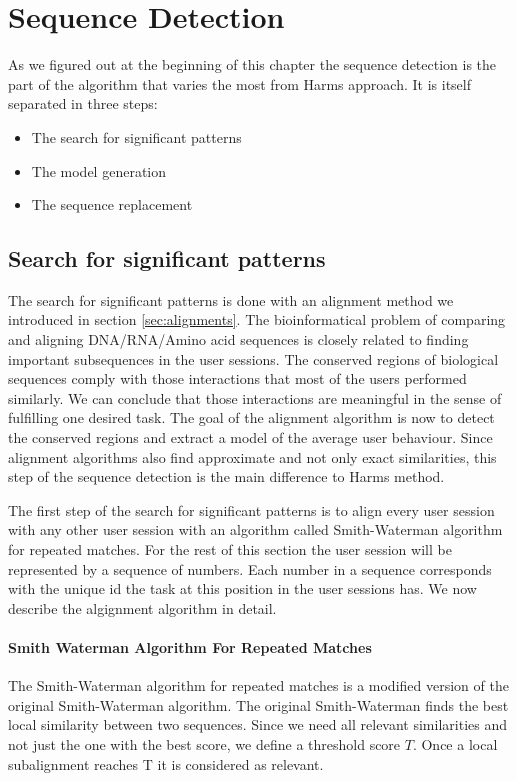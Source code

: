 \section{Sequence Detection}
As we figured out at the beginning of this chapter the sequence detection is the part of the algorithm that varies the most from Harms approach.
It is itself separated in three steps:
\begin{itemize}
	\item The search for significant patterns
	\item The model generation
	\item The sequence replacement
\end{itemize}

\subsection{Search for significant patterns}		
The search for significant patterns is done with an alignment method we introduced in section \ref{sec:alignments}. 
The bioinformatical problem of comparing and aligning DNA/RNA/Amino acid sequences is closely related to finding important subsequences in the user sessions. 
The conserved regions of biological sequences comply with those interactions that most of the users performed similarly. 
We can conclude that those interactions are meaningful in the sense of fulfilling one desired task.
The goal of the alignment algorithm is now to detect the conserved regions and extract a model of the average user behaviour. 
Since alignment algorithms also find approximate and not only exact similarities, this step of the sequence detection is the main difference to Harms method.

The first step of the search for significant patterns is to align every user session with any other user session with an algorithm called Smith-Waterman algorithm for repeated matches.
For the rest of this section the user session will be represented by a sequence of numbers. Each number in a sequence corresponds with the unique id the task at this position in the user sessions has.
We now describe the algignment algorithm in detail.

\paragraph{Smith Waterman Algorithm For Repeated Matches}
The Smith-Waterman algorithm for repeated matches\cite{durbin1998} is a modified version of the original Smith-Waterman algorithm\cite{waterman1981}.
The original Smith-Waterman finds the best local similarity between two sequences.
Since we need all relevant similarities and not just the one with the best score, we define a threshold score $T$.
Once a local subalignment reaches T it is considered as relevant.

